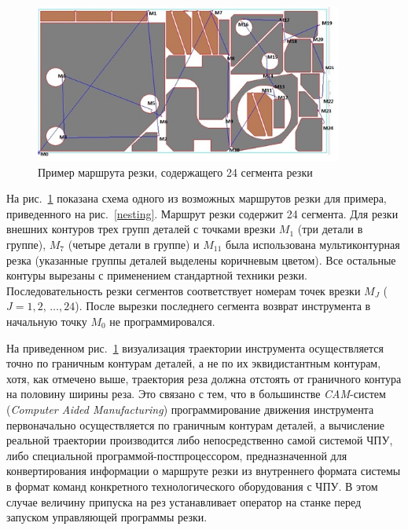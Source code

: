 \documentclass[11pt,twoside,openany]{report}
\begin{document}
\begin{figure}
  \begin{center}
  \includegraphics[width=0.9\textwidth]{cutting.png}
  \caption{Пример маршрута резки, содержащего 24 сегмента резки}
  \label{cutting}
  \end{center}
\end{figure}

На рис.~\ref{cutting}
показана схема одного из возможных маршрутов резки для примера,
приведенного на рис.~\ref{nesting}.
Маршрут резки содержит 24 сегмента.
Для резки внешних контуров трех групп деталей
с точками врезки $M_1$
(три детали в группе),
$M_7$
(четыре детали в группе) и
$M_{11}$
была использована мультиконтурная резка
(указанные группы деталей выделены коричневым цветом).
Все остальные контуры вырезаны с применением стандартной техники резки.
Последовательность резки сегментов соответствует
номерам точек врезки $M_J$ ($J=1,2,\,\dots, 24$).
После вырезки последнего сегмента
возврат инструмента в начальную точку $M_0$
не программировался.

На приведенном рис.~\ref{cutting}
визуализация траектории инструмента
осуществляется точно по граничным контурам деталей,
а не по их эквидистантным контурам, хотя,
как отмечено выше,
траектория реза должна отстоять от
граничного контура на половину ширины реза.
Это связано с тем, что в большинстве
\textit{CAM}-систем
(\textit{Computer Aided Manufacturing})
программирование движения инструмента первоначально
осуществляется по граничным контурам деталей,
а вычисление реальной траектории производится
либо непосредственно самой системой ЧПУ,
либо специальной программой-постпроцессором,
предназначенной для конвертирования информации о
маршруте резки из внутреннего формата системы в
формат команд конкретного технологического оборудования с ЧПУ.
В этом случае величину припуска на рез
устанавливает оператор на станке перед запуском
управляющей программы резки.
\end{document}
